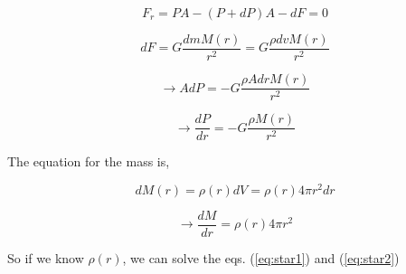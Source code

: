 \documentclass[]{beamer}
\begin{document}


\begin{frame}


\begin{equation*}
 F_r=PA-(P+dP)A-dF=0
\end{equation*}


  
\begin{equation*}
dF=G\frac{dmM(r)}{r^2}=G\frac{\rho dv M(r)}{r^2}
\end{equation*}

\begin{equation*}
\rightarrow AdP=-G\frac{\rho Adr M(r)}{r^2}
\end{equation*}

\begin{equation}
\rightarrow \boxed{\frac{dP}{dr}=-G\frac{\rho M(r)}{r^2}}
\label{eq:star1}
\end{equation}





  \end{frame}



\begin{frame}



The equation for the mass is,

\begin{equation}
dM(r)=\rho(r)dV=\rho(r) 4 \pi r^2dr
\end{equation}

\begin{equation}
\rightarrow \frac{dM}{dr}=\rho(r) 4 \pi r^2
\label{eq:star2}
\end{equation}
  
So if we know $\rho(r)$, we can solve the eqs. (\ref{eq:star1}) and (\ref{eq:star2})

  \end{frame}




  

\end{document}
